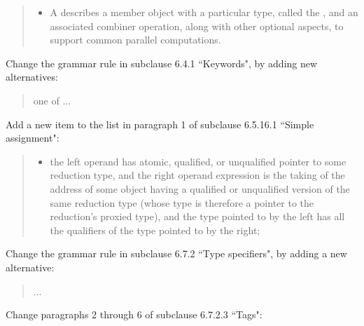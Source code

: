 \begin{quote}
\begin{itemize}
\item
A
describes a member object with a particular type,
called the
,
and an associated combiner operation,
along with other optional aspects,
to support common parallel computations.
\end{itemize}
\end{quote}

Change the grammar rule in subclause 6.4.1 ``Keywords",
by adding new alternatives:

\begin{quote}
\begin{bnf}
\textnormal{one of}\br
...\br
{}\br
{}\br
{}\br
{}\br
{}\br
{}
\end{bnf}
\end{quote}

Add a new item to the list
in paragraph 1 of subclause 6.5.16.1 ``Simple assignment":

\begin{quote}
\begin{itemize}
\item
the left operand has atomic, qualified, or unqualified
pointer to some reduction type,
and the right operand expression
is the taking of the address
of some object having a qualified or unqualified version
of the same reduction type
(whose type is therefore a pointer to the reduction's proxied type),
and the type pointed to by the left
has all the qualifiers of the type pointed to by the right;
\end{itemize}
\end{quote}

Change the grammar rule in subclause 6.7.2 ``Type specifiers",
by adding a new alternative:

\begin{quote}
\begin{bnf}
\br
...
\br
{}
\end{bnf}
\end{quote}

Change paragraphs 2 through 6 of subclause 6.7.2.3 ``Tags":

